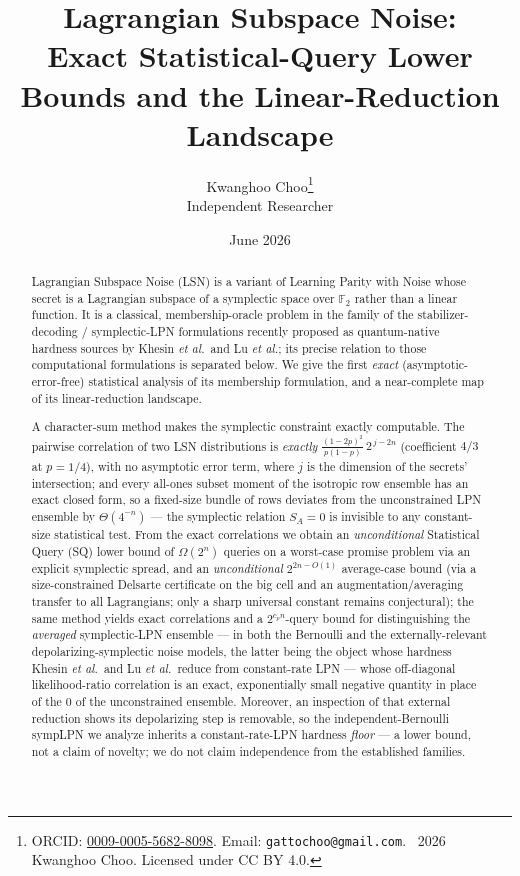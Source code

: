 \documentclass[11pt,a4paper]{article}
\title{Lagrangian Subspace Noise: \\ Exact Statistical-Query Lower Bounds and the Linear-Reduction Landscape}
\author{Kwanghoo Choo\thanks{ORCID: \href{https://orcid.org/0009-0005-5682-8098}{0009-0005-5682-8098}. Email: \texttt{gattochoo@gmail.com}. \textcopyright~2026 Kwanghoo Choo. Licensed under CC BY 4.0.}\\ \normalsize Independent Researcher}
\date{June 2026}
\theoremstyle{plain}
\theoremstyle{definition}
\newcommand{\F}{\mathbb{F}}
\newcommand{\etal}{\textit{et al.}}
\begin{document}
\maketitle

\begin{abstract}
Lagrangian Subspace Noise (LSN) is a variant of Learning Parity with Noise whose secret is a Lagrangian subspace of a symplectic space over $\F_2$ rather than a linear function. It is a classical, membership-oracle problem in the family of the stabilizer-decoding / symplectic-LPN formulations recently proposed as quantum-native hardness sources by Khesin \etal\ and Lu \etal; its precise relation to those computational formulations is separated below. We give the first \emph{exact} (asymptotic-error-free) statistical analysis of its membership formulation, and a near-complete map of its linear-reduction landscape.

A character-sum method makes the symplectic constraint exactly computable. The pairwise correlation of two LSN distributions is \emph{exactly} $\tfrac{(1-2p)^2}{p(1-p)}\,2^{\,j-2n}$ (coefficient $4/3$ at $p=1/4$), with no asymptotic error term, where $j$ is the dimension of the secrets' intersection; and every all-ones subset moment of the isotropic row ensemble has an exact closed form, so a fixed-size bundle of rows deviates from the unconstrained LPN ensemble by $\Theta(4^{-n})$ --- the symplectic relation $S_A=0$ is invisible to any constant-size statistical test. From the exact correlations we obtain an \emph{unconditional} Statistical Query (SQ) lower bound of $\Omega(2^n)$ queries on a worst-case promise problem via an explicit symplectic spread, and an \emph{unconditional} $2^{2n-O(1)}$ average-case bound (via a size-constrained Delsarte certificate on the big cell and an augmentation/averaging transfer to all Lagrangians; only a sharp universal constant remains conjectural); the same method yields exact correlations and a $2^{c_p n}$-query bound for distinguishing the \emph{averaged} symplectic-LPN ensemble --- in both the Bernoulli and the externally-relevant depolarizing-symplectic noise models, the latter being the object whose hardness Khesin \etal\ and Lu \etal\ reduce from constant-rate LPN --- whose off-diagonal likelihood-ratio correlation is an exact, exponentially small negative quantity in place of the $0$ of the unconstrained ensemble. Moreover, an inspection of that external reduction shows its depolarizing step is removable, so the independent-Bernoulli sympLPN we analyze inherits a constant-rate-LPN hardness \emph{floor} --- a lower bound, not a claim of novelty; we do not claim independence from the established families.


\end{abstract}
\end{document}
